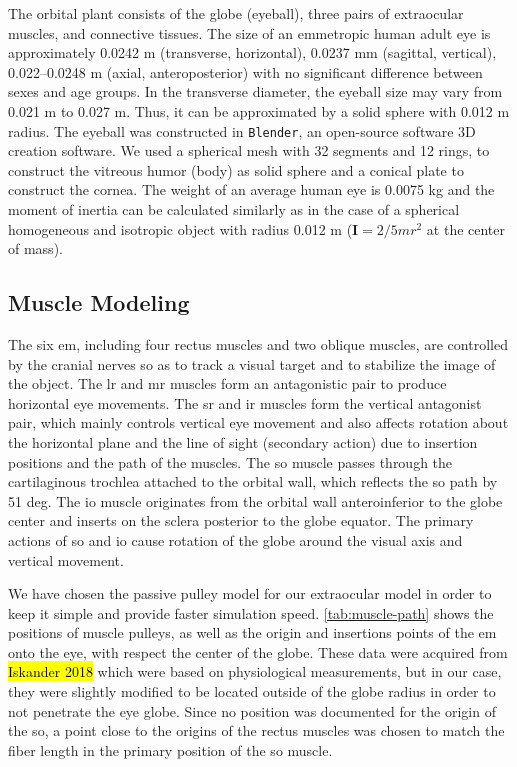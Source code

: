 \documentclass[11pt,a4paper,draft=false]{report}
\newcommand{\mat}[1]{\bm{#1}}
\begin{document}
The orbital plant consists of the globe (eyeball), three pairs of extraocular
muscles, and connective tissues. The size of an emmetropic human adult eye is
approximately 0.0242 m (transverse, horizontal), 0.0237 mm (sagittal, vertical),
0.022–0.0248 m (axial, anteroposterior) with no significant difference between
sexes and age groups. In the transverse diameter, the eyeball size may vary from
0.021 m to 0.027 m. Thus, it can be approximated by a solid sphere with 0.012 m
radius. The eyeball was constructed in \texttt{Blender}, an open-source software
3D creation software. We used a spherical mesh with 32 segments and 12 rings, to
construct the vitreous humor (body) as solid sphere and a conical plate to
construct the cornea. The weight of an average human eye is 0.0075 kg and the
moment of inertia can be calculated similarly as in the case of a spherical
homogeneous and isotropic object with radius 0.012 m ($\mat{I} = 2/5 m r^2$ at
the center of mass).

\subsection*{Muscle Modeling}\label{sec:muscle-modeling}

The six \gls{em}, including four rectus muscles and two oblique muscles, are
controlled by the cranial nerves so as to track a visual target and to stabilize
the image of the object. The \gls{lr} and \gls{mr} muscles form an antagonistic
pair to produce horizontal eye movements. The \gls{sr} and \gls{ir} muscles form
the vertical antagonist pair, which mainly controls vertical eye movement and
also affects rotation about the horizontal plane and the line of sight
(secondary action) due to insertion positions and the path of the muscles. The
\gls{so} muscle passes through the cartilaginous trochlea attached to the
orbital wall, which reflects the \gls{so} path by 51 deg. The \gls{io} muscle
originates from the orbital wall anteroinferior to the globe center and inserts
on the sclera posterior to the globe equator. The primary actions of \gls{so}
and \gls{io} cause rotation of the globe around the visual axis and vertical
movement.

We have chosen the passive pulley model for our extraocular model in order to
keep it simple and provide faster simulation speed. \autoref{tab:muscle-path}
shows the positions of muscle pulleys, as well as the origin and insertions
points of the \gls{em} onto the eye, with respect the center of the globe. These
data were acquired from \hl{Iskander 2018} which were based on physiological
measurements, but in our case, they were slightly modified to be located outside
of the globe radius in order to not penetrate the eye globe. Since no position
was documented for the origin of the \gls{so}, a point close to the origins of
the rectus muscles was chosen to match the fiber length in the primary position
of the \gls{so} muscle.
\end{document}
